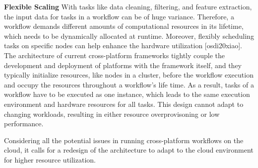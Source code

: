 \textbf{Flexible Scaling} With tasks like data cleaning, filtering, and feature extraction, the input data for tasks in a workflow can be of huge variance. Therefore, a workflow demands different amounts of computational resources in its lifetime, which needs to be dynamically allocated at runtime. Moreover, flexibly scheduling tasks on specific nodes can help enhance the hardware utilization [osdi20xiao]. The architecture of current cross-platform frameworks tightly couple the development and deployment of platforms with the framework itself, and they typically initialize resources, like nodes in a cluster, before the workflow execution and occupy the resources throughout a workflow's life time. As a result, tasks of a workflow have to be executed as one instance, which leads to the same execution environment and hardware resources for all tasks. This design cannot adapt to changing workloads, resulting in either resource overprovisoning or low performance.

Considering all the potential issues in running cross-platform workflows on the cloud, it calls for a redesign of the architecture to adapt to the cloud environment for higher resource utilization.
